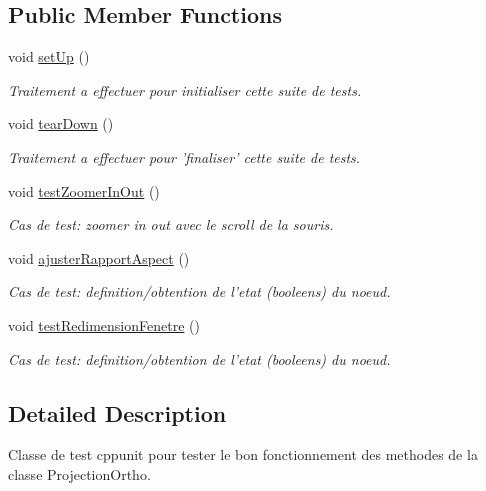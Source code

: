 \subsection*{Public Member Functions}
\begin{DoxyCompactItemize}
\item 
void \hyperlink{group__inf2990_gaf0da04f36972757ddcfc1c09bba812a4}{set\-Up} ()
\begin{DoxyCompactList}\small\item\em Traitement a effectuer pour initialiser cette suite de tests. \end{DoxyCompactList}\item 
void \hyperlink{group__inf2990_gafb91f8be6a3a9addf5909684b4f21cb0}{tear\-Down} ()
\begin{DoxyCompactList}\small\item\em Traitement a effectuer pour 'finaliser' cette suite de tests. \end{DoxyCompactList}\item 
void \hyperlink{group__inf2990_gac39b4634d781adb80ffefcc145dcac80}{test\-Zoomer\-In\-Out} ()
\begin{DoxyCompactList}\small\item\em Cas de test\-: zoomer in out avec le scroll de la souris. \end{DoxyCompactList}\item 
void \hyperlink{group__inf2990_ga8cae25887c7a3d3128a3f7117feb8995}{ajuster\-Rapport\-Aspect} ()
\begin{DoxyCompactList}\small\item\em Cas de test\-: definition/obtention de l'etat (booleens) du noeud. \end{DoxyCompactList}\item 
void \hyperlink{group__inf2990_ga5c9bc480965ea0b477eddd49a7c13511}{test\-Redimension\-Fenetre} ()
\begin{DoxyCompactList}\small\item\em Cas de test\-: definition/obtention de l'etat (booleens) du noeud. \end{DoxyCompactList}\end{DoxyCompactItemize}


\subsection{Detailed Description}
Classe de test cppunit pour tester le bon fonctionnement des methodes de la classe Projection\-Ortho. 

